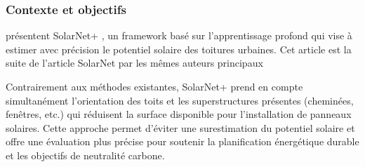\subsubsection{Contexte et objectifs}
\par{\citeauthor{li_deep_2024} présentent SolarNet+ \cite{li_deep_2024}, un framework basé sur l'apprentissage profond qui vise à estimer avec précision le potentiel solaire des toitures urbaines. Cet article est la suite de l'article \cite{li_solarnet_2023} SolarNet par les mêmes auteurs principaux}
\par{Contrairement aux méthodes existantes, SolarNet+ prend en compte simultanément l'orientation des toits et les superstructures présentes (cheminées, fenêtres, etc.) qui réduisent la surface disponible pour l'installation de panneaux solaires. Cette approche permet d'éviter une surestimation du potentiel solaire et offre une évaluation plus précise pour soutenir la planification énergétique durable et les objectifs de neutralité carbone.}


